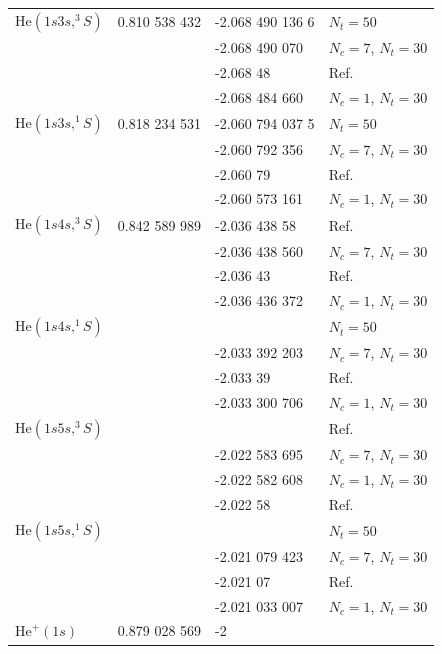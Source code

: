\documentclass[aip
, pra
, showpacs
, aps
, twocolumn
, groupedaddress
, floatfix
]{revtex4}
\begin{document}
\begin{table}[htb]
\begin{ruledtabular}
\begin{tabular}{llll}
$\mbox{He}(1s3s,^3S)$    & 0.810 538 432 & -2.068 490 136 6 & $N_t=50$  \\
                         &               & -2.068 490 070   &  $N_c=7$, $N_t=30$    \\
                         &               & -2.068 48        &  Ref. \cite{BS10p022715}    \\
                         &               & -2.068 484 660   &  $N_c=1$, $N_t=30$    \\
\hline
$\mbox{He}(1s3s,^1S)$    & 0.818 234 531 & -2.060 794 037 5 & $N_t=50$ \\
                         &               & -2.060 792 356   &  $N_c=7$, $N_t=30$    \\
                         &               & -2.060 79     &  Ref. \cite{BS10p022715}    \\
                         &               & -2.060 573 161   &  $N_c=1$, $N_t=30$    \\
\hline
$\mbox{He}(1s4s,^3S)$    & 0.842 589 989 & -2.036 438 58    & Ref. \cite{DHIF94} \\
                         &               & -2.036 438 560   &  $N_c=7$, $N_t=30$    \\
                         &               & -2.036 43     &  Ref. \cite{BS10p022715}    \\
                         &               & -2.036 436 372   &  $N_c=1$, $N_t=30$    \\
\hline
$\mbox{He}(1s4s,^1S)$    &               &  & $N_t=50$ \\
                         &               & -2.033 392 203 &  $N_c=7$, $N_t=30$    \\
                         &               & -2.033 39      &  Ref. \cite{BS10p022715}    \\
                         &               & -2.033 300 706 &  $N_c=1$, $N_t=30$    \\
\hline
$\mbox{He}(1s5s,^3S)$    &         &     & Ref. \cite{DHIF94} \\
                         &               & -2.022 583 695   &  $N_c=7$, $N_t=30$    \\
                         &               & -2.022 582 608   &  $N_c=1$, $N_t=30$    \\
                         &               & -2.022 58        &  Ref. \cite{BS10p022715}    \\
\hline
$\mbox{He}(1s5s,^1S)$    &               &  & $N_t=50$ \\
                         &               & -2.021 079 423 &  $N_c=7$, $N_t=30$    \\
                         &               & -2.021 07        &  Ref. \cite{BS10p022715}    \\
                         &               & -2.021 033 007   &  $N_c=1$, $N_t=30$    \\
\hline
$\mbox{He}^+(1s)$        & 0.879 028 569 & -2 	 &    \\


\end{tabular}
\end{ruledtabular}
\end{table}
\end{document}

